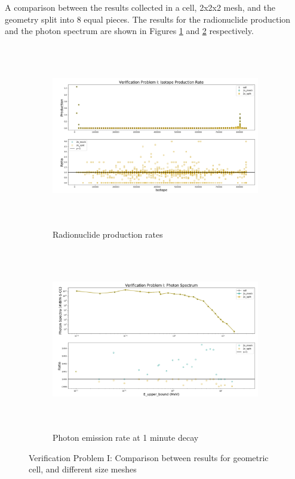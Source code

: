 %
A comparison between the results collected in a cell, 2x2x2 mesh, and
the geometry split into 8 equal pieces. The results for the radionuclide production
and the photon spectrum are shown in Figures \ref{fig:1prod_cell_2x} and
\ref{fig:1spec_cell_2x} respectively.
\begin{figure}[h!]
 \begin{centering}
 \centering
 \begin{subfigure}[b]{.8\textwidth}
 \includegraphics[width=0.99\linewidth,height=8cm]{../figs/toy_p1/prod_VPI_2x.png}
 \caption{Radionuclide production rates}
 \label{fig:1prod_cell_2x}
 \end{subfigure}
 \hspace{0.05cm}
 \begin{subfigure}[b]{.8\textwidth}
 \centering
 \includegraphics[width=.99\linewidth,height=8cm]{../figs/toy_p1/spec_VPI_2x.png}
 \caption{Photon emission rate at 1 minute decay }
 \label{fig:1spec_cell_2x}
 \end{subfigure}
 \caption{Verification Problem I: Comparison between results for geometric cell, and different size meshes}
 \label{fig:cell_2x}
 \end{centering}
\end{figure}

